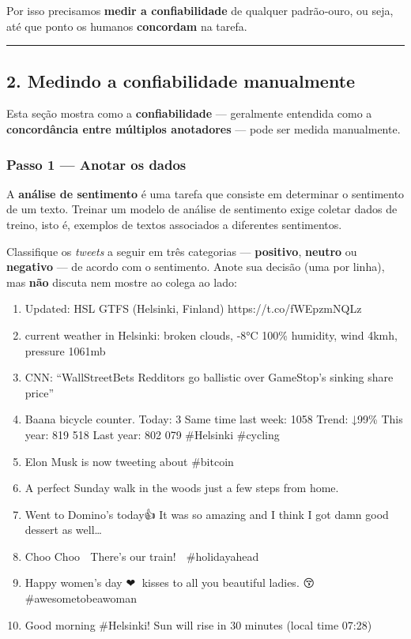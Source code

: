\documentclass[
  brazilian,
  11pt,
]{article}
\providecommand{\tightlist}{%
  \setlength{\itemsep}{0pt}\setlength{\parskip}{0pt}}
\begin{document}
Por isso precisamos \textbf{medir a confiabilidade} de qualquer
padrão‑ouro, ou seja, até que ponto os humanos \textbf{concordam} na
tarefa.

\begin{center}\rule{0.5\linewidth}{0.5pt}\end{center}

\subsection{2. Medindo a confiabilidade
manualmente}\label{medindo-a-confiabilidade-manualmente}

Esta seção mostra como a \textbf{confiabilidade} --- geralmente
entendida como a \textbf{concordância entre múltiplos anotadores} ---
pode ser medida manualmente.

\subsubsection{Passo 1 --- Anotar os
dados}\label{passo-1-anotar-os-dados}

A \textbf{análise de sentimento} é uma tarefa que consiste em determinar
o sentimento de um texto. Treinar um modelo de análise de sentimento
exige coletar dados de treino, isto é, exemplos de textos associados a
diferentes sentimentos.

Classifique os \emph{tweets} a seguir em três categorias ---
\textbf{positivo}, \textbf{neutro} ou \textbf{negativo} --- de acordo
com o sentimento. Anote sua decisão (uma por linha), mas \textbf{não}
discuta nem mostre ao colega ao lado:

\begin{enumerate}
\def\labelenumi{\arabic{enumi}.}
\tightlist
\item
  Updated: HSL GTFS (Helsinki, Finland) https://t.co/fWEpzmNQLz
\item
  current weather in Helsinki: broken clouds, -8°C 100\% humidity, wind
  4kmh, pressure 1061mb
\item
  CNN: ``WallStreetBets Redditors go ballistic over GameStop's sinking
  share price''
\item
  Baana bicycle counter. Today: 3 Same time last week: 1058 Trend: ↓99\%
  This year: 819 518 Last year: 802 079 \#Helsinki \#cycling
\item
  Elon Musk is now tweeting about \#bitcoin
\item
  A perfect Sunday walk in the woods just a few steps from home.
\item
  Went to Domino's today👍 It was so amazing and I think I got damn good
  dessert as well\ldots{}
\item
  Choo Choo 🚂 There's our train! 🎉 \#holidayahead
\item
  Happy women's day ❤💋 kisses to all you beautiful ladies. 😚
  \#awesometobeawoman
\item
  Good morning \#Helsinki! Sun will rise in 30 minutes (local time
  07:28)
\end{enumerate}
\end{document}

